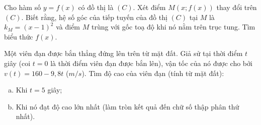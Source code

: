 \begin{bt}%
 
	Cho hàm số $y = f(x)$ có đồ thị là $(C)$. Xét điểm $M(x; f(x))$ thay đổi trên $(C)$. Biết rằng, hệ số góc của tiếp tuyến của đồ thị $(C)$ tại $M$ là $k_M = (x - 1)^2$ và điểm $M$ trùng với gốc toạ độ khi nó nằm trên trục tung. Tìm biểu thức $f(x)$.
\end{bt}

\begin{bt}%

	Một viên đạn được bắn thẳng đứng lên trên từ mặt đất. Giả sử tại thời điểm $t$ giây (coi $t = 0$ là thời điểm viên đạn được bắn lên), vận tốc của nó được cho bởi $v(t) = 160-9{,}8t$ ($m/s$). Tìm độ cao của viên đạn (tính từ mặt đất):
	\begin{enumerate}[a)]
		\item Khi $t = 5$ giây;
		\item Khi nó đạt độ cao lớn nhất (làm tròn kết quả đến chữ số thập phân thứ nhất).
	\end{enumerate}
\end{bt}

